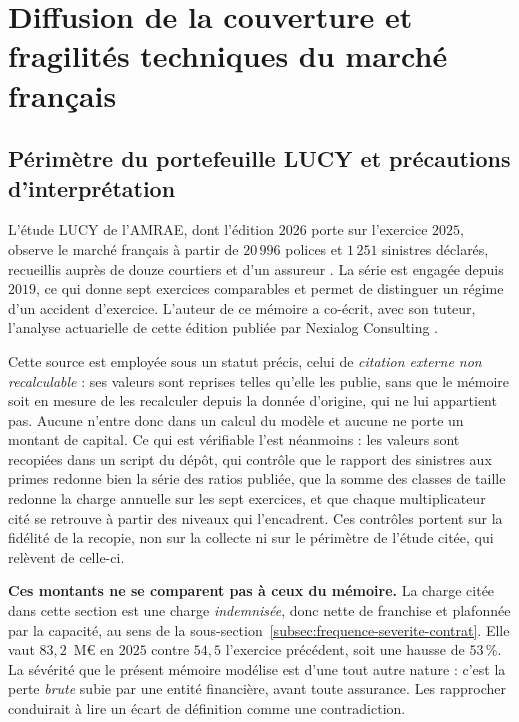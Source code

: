 
\section{Diffusion de la couverture et fragilités techniques du marché français}

\subsection{Périmètre du portefeuille LUCY et précautions d'interprétation}
\label{subsec:lucy-perimetre}

L'étude LUCY de l'AMRAE, dont l'édition $2026$ porte sur l'exercice $2025$, observe le marché
français à partir de $20\,996$ polices et $1\,251$ sinistres déclarés, recueillis auprès de douze
courtiers et d'un assureur \citep{amraeLucy2026}. La série est engagée depuis $2019$, ce qui donne
sept exercices comparables et permet de distinguer un régime d'un accident d'exercice. L'auteur de
ce mémoire a co-écrit, avec son tuteur, l'analyse actuarielle de cette édition publiée par
Nexialog Consulting \citep{RapiorKaddouri2026}.

Cette source est employée sous un statut précis, celui de \emph{citation externe non
recalculable} : ses valeurs sont reprises telles qu'elle les publie, sans que le mémoire soit en
mesure de les recalculer depuis la donnée d'origine, qui ne lui appartient pas. Aucune n'entre
donc dans un calcul du modèle et aucune ne porte un montant de capital. Ce qui est vérifiable
l'est néanmoins : les valeurs sont recopiées dans un script du dépôt, qui contrôle que le rapport
des sinistres aux primes redonne bien la série des ratios publiée, que la somme des classes de
taille redonne la charge annuelle sur les sept exercices, et que chaque multiplicateur cité se
retrouve à partir des niveaux qui l'encadrent. Ces contrôles portent sur la fidélité de la
recopie, non sur la collecte ni sur le périmètre de l'étude citée, qui relèvent de celle-ci.

\begin{attention}
\textbf{Ces montants ne se comparent pas à ceux du mémoire.} La charge citée dans cette section
est une charge \emph{indemnisée}, donc nette de franchise et plafonnée par la capacité, au sens
de la sous-section~\ref{subsec:frequence-severite-contrat}. Elle vaut $83{,}2$~M\euro{} en $2025$
contre $54{,}5$ l'exercice précédent, soit une hausse de $53\,\%$. La sévérité que le présent
mémoire modélise est d'une tout autre nature : c'est la perte \emph{brute} subie par une entité
financière, avant toute assurance. Les rapprocher conduirait à lire un écart de définition comme
une contradiction.
\end{attention}

